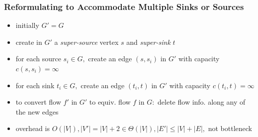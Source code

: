\documentclass[10pt,aspectratio=169]{beamer}
\begin{document}
\begin{frame} \frametitle{Reformulating to Accommodate Multiple Sinks or Sources}
  \begin{itemize}
    \item initially $G'=G$
    \item create in $G'$ a \emph{super-source} vertex $s$ and \emph{super-sink} $t$
    \item for each source $s_i \in G,$ create an edge $(s, s_i)$ in $G'$ with capacity
      $c(s, s_i) = \infty$
    \item for each sink $t_i \in G,$ create an edge $(t_i, t)$ in $G'$ with capacity
      $c(t_i, t) = \infty$
    \item to convert flow $f'$ in $G'$ to equiv. flow $f$ in $G:$ delete flow info.
      along any of the new edges
    \item overhead is $O(|V|), |V'|=|V|+2 \in \Theta(|V|), |E'| \leq |V|+|E|,$ not bottleneck
  \end{itemize}
\end{frame}
\end{document}
